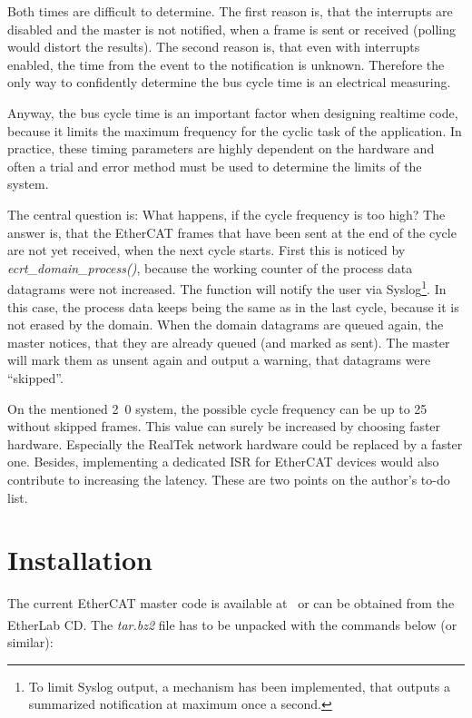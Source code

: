 \documentclass[a4paper,12pt,BCOR6mm,bibtotoc,idxtotoc]{scrbook}
\begin{document}
Both times are difficult to determine. The first reason is, that the
interrupts are disabled and the master is not notified, when a frame
is sent or received (polling would distort the results). The second
reason is, that even with interrupts enabled, the time from the event
to the notification is unknown. Therefore the only way to confidently
determine the bus cycle time is an electrical measuring.

Anyway, the bus cycle time is an important factor when designing realtime code,
because it limits the maximum frequency for the cyclic task of the application.
In practice, these timing parameters are highly dependent on the hardware and
often a trial and error method must be used to determine the limits of the
system.

The central question is: What happens, if the cycle frequency is too high? The
answer is, that the EtherCAT frames that have been sent at the end of the cycle
are not yet received, when the next cycle starts.  First this is noticed by
\textit{ecrt\_domain\_process()}, because the working counter of the process
data datagrams were not increased. The function will notify the user via
Syslog\footnote{To limit Syslog output, a mechanism has been implemented, that
outputs a summarized notification at maximum once a second.}. In this case, the
process data keeps being the same as in the last cycle, because it is not
erased by the domain. When the domain datagrams are queued again, the master
notices, that they are already queued (and marked as sent). The master will
mark them as unsent again and output a warning, that datagrams were
``skipped''.

On the mentioned \unit{2.0}{\giga\hertz} system, the possible cycle frequency
can be up to \unit{25}{\kilo\hertz} without skipped frames. This value can
surely be increased by choosing faster hardware. Especially the RealTek network
hardware could be replaced by a faster one. Besides, implementing a dedicated
ISR for EtherCAT devices would also contribute to increasing the latency. These
are two points on the author's to-do list.


\chapter{Installation}
\label{sec:installation}

The current EtherCAT master code is available at~\cite{etherlab} or
can be obtained from the EtherLab\textsuperscript{\textregistered} CD.
The \textit{tar.bz2} file has to be unpacked with the commands below
(or similar):
\end{document}
